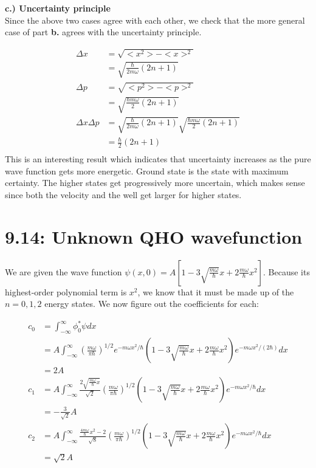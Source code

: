 \documentclass[10pt]{article} %
\begin{document}
\textbf{c.) Uncertainty principle}\\
Since the above two cases agree with each other, we check that the more general case of part
\textbf{b.} agrees with the uncertainty principle.

\begin{align*}
  \Delta x &= \sqrt{<x^2>-<x>^2}\\
  &= \sqrt{\frac{\hbar}{2m\omega} \left(2n+1\right)}\\
  \Delta p &= \sqrt{<p^2>-<p>^2}\\
  &= \sqrt{\frac{\hbar m\omega}{2}\left(2n + 1\right)}\\
  \Delta x \Delta p &= \sqrt{\frac{\hbar}{2m\omega} \left(2n+1\right)}
  \sqrt{\frac{\hbar m\omega}{2}\left(2n + 1\right)}\\
  &= \frac{\hbar}{2}(2n+1)\\
\end{align*}
This is an interesting result which indicates that uncertainty increases as the pure wave function
gets more energetic. Ground state is the state with maximum certainty. The higher states get
progressively more uncertain, which makes sense since both the velocity and the well get larger
for higher states.\\

\section{9.14: Unknown QHO wavefunction}
We are given the wave function $\psi(x,0) = A\left[1 - 3\sqrt{\frac{m\omega}{\hbar}}x +
  2\frac{m\omega}{\hbar}x^2\right]$. Because its highest-order polynomial term is $x^2$, we know
that it must be made up of the $n = 0, 1, 2$ energy states. We now figure out the coefficients for
each:

\begin{align*}
  c_0 &= \int_{-\infty}^{\infty} \phi_0^*\psi dx\\
  &= A\int_{-\infty}^{\infty} \left(\frac{m\omega}{\pi\hbar}\right)^{1/2}e^{-m\omega x^2/\hbar}
  \left(1 - 3\sqrt{\frac{m\omega}{\hbar}}x +
  2\frac{m\omega}{\hbar}x^2\right)e^{-m\omega x^2/(2\hbar)}dx\\
  &= 2A\\
  c_1 &= A\int_{-\infty}^{\infty} \frac{2\sqrt{\frac{m\omega}{\hbar}x}}{\sqrt{2}}
    \left(\frac{m\omega}{\pi\hbar}\right)^{1/2} \left(1 - 3\sqrt{\frac{m\omega}{\hbar}}x +
    2\frac{m\omega}{\hbar}x^2\right)e^{-m\omega x^2/\hbar}dx\\
 &= -\frac{3}{\sqrt{2}}A\\
 c_2 &= A\int_{-\infty}^{\infty} \frac{\frac{4m\omega}{\hbar}x^2 - 2}{\sqrt{8}}
    \left(\frac{m\omega}{\pi\hbar}\right)^{1/2} \left(1 - 3\sqrt{\frac{m\omega}{\hbar}}x +
    2\frac{m\omega}{\hbar}x^2\right)e^{-m\omega x^2/\hbar}dx\\
 &= \sqrt{2}A\\
\end{align*}
\end{document}
